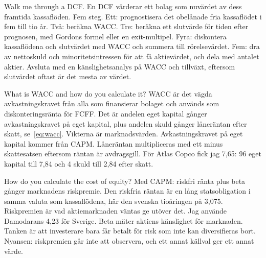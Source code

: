 \begin{fraga}{Walk me through a DCF.}
En DCF värderar ett bolag som nuvärdet av dess framtida kassaflöden. Fem steg. Ett: prognostisera
det obelånade fria kassaflödet i fem till tio år. Två: beräkna WACC. Tre: beräkna ett slutvärde
för tiden efter prognosen, med Gordons formel eller en exit-multipel. Fyra: diskontera
kassaflödena och slutvärdet med WACC och summera till rörelsevärdet. Fem: dra av nettoskuld och
minoritetsintressen för att få aktievärdet, och dela med antalet aktier. Avsluta med en
känslighetsanalys på WACC och tillväxt, eftersom slutvärdet oftast är det mesta av värdet.
\end{fraga}

\begin{fraga}{What is WACC and how do you calculate it?}
WACC är det vägda avkastningskravet från alla som finansierar bolaget och används som
diskonteringsränta för FCFF. Det är andelen eget kapital gånger avkastningskravet på eget
kapital, plus andelen skuld gånger låneräntan efter skatt, se~\eqref{eq:wacc}. Vikterna är
marknadsvärden. Avkastningskravet på eget kapital kommer från CAPM. Låneräntan multipliceras
med ett minus skattesatsen eftersom räntan är avdragsgill. För Atlas Copco fick jag 7,65\pct:
96\pct{} eget kapital till 7,84\pct{} och 4\pct{} skuld till 2,84\pct{} efter skatt.
\end{fraga}

\begin{fraga}{How do you calculate the cost of equity?}
Med CAPM: riskfri ränta plus beta gånger marknadens riskpremie. Den riskfria räntan är en lång
statsobligation i samma valuta som kassaflödena, här den svenska tioåringen på 3,075\pct.
Riskpremien är vad aktiemarknaden väntas ge utöver det. Jag använde Damodarans 4,23\pct{} för
Sverige. Beta mäter aktiens känslighet för marknaden. Tanken är att investerare bara får
betalt för risk som inte kan diversifieras bort. Nyansen: riskpremien går inte att observera,
och ett annat källval ger ett annat värde.
\end{fraga}

